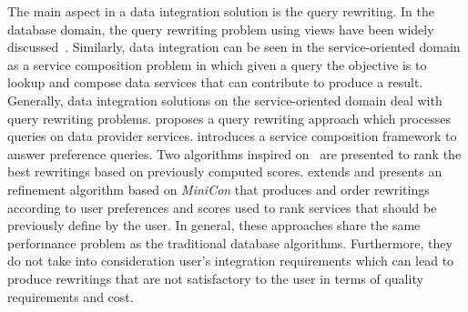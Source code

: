 The main aspect in a data integration solution is the query rewriting. In the database domain, the query rewriting problem using views have been widely discussed~\cite{Halevy:2001,Levy:1996,Duschka:1997,Pottinger:2001}.
Similarly, data integration can be seen in the service-oriented domain as a service composition problem in which given a query the objective is to lookup and compose data services that can contribute to produce a result.
%
%
%
%
%
%
%
Generally, data integration solutions on the service-oriented domain deal with
query rewriting problems. \cite{Barhamgi2010} proposes a query rewriting approach which processes queries on data provider services.
%
\cite{Benouaret2011} introduces a service composition framework to answer
preference queries. Two algorithms inspired on~\cite{Barhamgi2010} are presented to rank the best rewritings based on previously computed scores.
%
\cite{ba2014} extends \cite{Umberto} and presents an refinement algorithm based
on \textit{MiniCon} that produces and order rewritings according to user preferences and scores used to rank services that should be previously define by the user.
In general, these approaches share the same performance problem as the traditional database algorithms. Furthermore, they do not take into consideration user's integration requirements which can lead to produce rewritings that are not satisfactory to the user in terms of quality requirements and cost.

